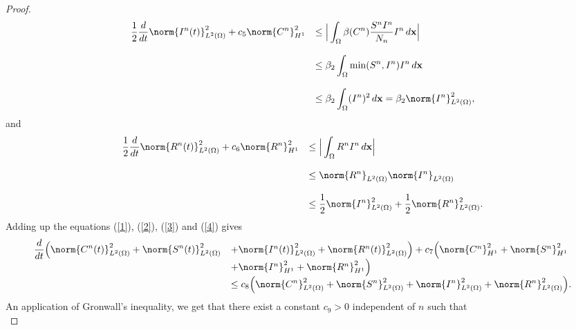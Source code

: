 \documentclass[10pt,number,preprint,times]{elsarticle}
\numberwithin{equation}{section} %
\begin{document}
\begin{proof}
		\begin{equation}\label{3} 
			\begin{array}{rl}	
				\displaystyle	\frac{1}{2} \frac{d}{dt}\norm{I^n(t)}_{L^2(\Omega)}^2 +c_5     \norm{C^n}_{H^{1}}^2 
				&	\leq \displaystyle
				\Big| \int_{\Omega} \beta(C^n) \frac{S^n I^n }{N_n} I^n\, d\mathbf{x} \Big|
				\\\\
				&	\leq \displaystyle\beta_2  \int_{\Omega} \min(S^n,I^n) I^n\, d\mathbf{x}
				\\\\
				&	\leq \displaystyle\beta_2  \int_{\Omega} (I^n)^2\, d\mathbf{x}=\beta_2 \norm{I^n}_{L^2(\Omega)}^2,
			\end{array}
		\end{equation}
		and
		\begin{equation}\label{4} 
			\begin{array}{rl}	
				\displaystyle	\frac{1}{2} \frac{d}{dt}\norm{R^n(t)}_{L^2(\Omega)}^2 +c_6     \norm{R^n}_{H^{1}}^2 
				&	\leq \displaystyle
				\Big| \int_{\Omega} R^n I^n\, d\mathbf{x} \Big|
				\\\\
				&	\leq \displaystyle \norm{R^n}_{L^2(\Omega)}\norm{I^n}_{L^2(\Omega)}
				\\\\
				&	\leq \displaystyle\frac{1}{2} \norm{I^n}_{L^2(\Omega)}^2 +\frac{1}{2} \norm{R^n}_{L^2(\Omega)}^2.
			\end{array}
		\end{equation}
		\noindent
		Adding up the equations (\ref{1}), (\ref{2}), (\ref{3}) and (\ref{4}) gives
		\begin{equation}\label{5} 
			\begin{array}{rl}	
				\displaystyle \frac{d}{dt}\Big(\norm{C^n(t)}_{L^2(\Omega)}^2+\norm{S^n(t)}_{L^2(\Omega)}^2&+\norm{I^n(t)}_{L^2(\Omega)}^2+\norm{R^n(t)}_{L^2(\Omega)}^2\Big) +c_7     \Big(\norm{C^n}_{H^{1}}^2 +\norm{S^n}_{H^{1}}^2 \\
				&+\norm{I^n}_{H^{1}}^2 +\norm{R^n}_{H^{1}}^2  \Big)	
				\\
				&\leq \displaystyle c_8 \Big(\norm{C^n}_{L^2(\Omega)}^2+\norm{S^n}_{L^2(\Omega)}^2+\norm{I^n}_{L^2(\Omega)}^2 + \norm{R^n}_{L^2(\Omega)}^2\Big).
			\end{array}
		\end{equation}
		An application of Gronwall's inequality, we get that there exist a constant $c_9>0$ independent of $n$ such that
		\begin{equation}\label{6}

\end{equation}
\end{proof}
\end{document}
